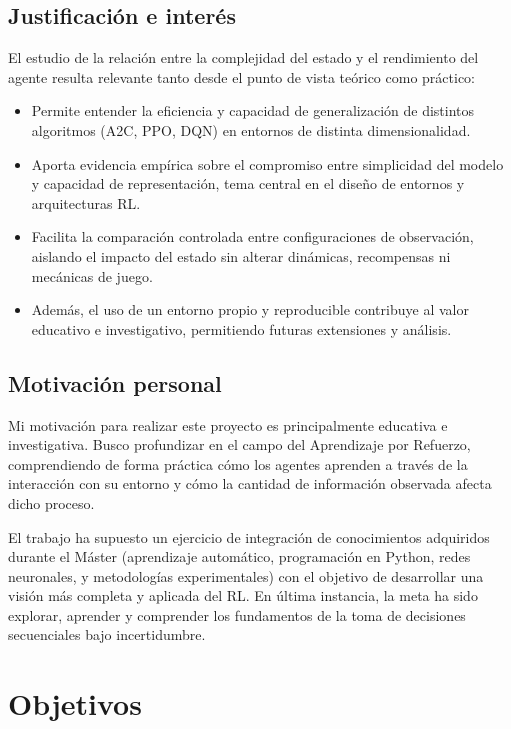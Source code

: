 \subsection{Justificación e interés}
El estudio de la relación entre la complejidad del estado y el rendimiento del agente resulta relevante tanto desde el punto de vista teórico como práctico:

\begin{itemize}
    \item Permite entender la eficiencia y capacidad de generalización de distintos algoritmos (A2C, PPO, DQN) en entornos de distinta dimensionalidad.
    \item Aporta evidencia empírica sobre el compromiso entre simplicidad del modelo y capacidad de representación, tema central en el diseño de entornos y arquitecturas RL.
    \item Facilita la comparación controlada entre configuraciones de observación, aislando el impacto del estado sin alterar dinámicas, recompensas ni mecánicas de juego.
    \item Además, el uso de un entorno propio y reproducible contribuye al valor educativo e investigativo, permitiendo futuras extensiones y análisis.
\end{itemize}

\subsection{Motivación personal}

Mi motivación para realizar este proyecto es principalmente educativa e investigativa.
Busco profundizar en el campo del Aprendizaje por Refuerzo, comprendiendo de forma práctica cómo los agentes aprenden a través de la interacción con su entorno y cómo la cantidad de información observada afecta dicho proceso.

El trabajo ha supuesto un ejercicio de integración de conocimientos adquiridos durante el Máster (aprendizaje automático, programación en Python, redes neuronales, y metodologías experimentales) con el objetivo de desarrollar una visión más completa y aplicada del RL.
En última instancia, la meta ha sido explorar, aprender y comprender los fundamentos de la toma de decisiones secuenciales bajo incertidumbre.

\section{Objetivos}

